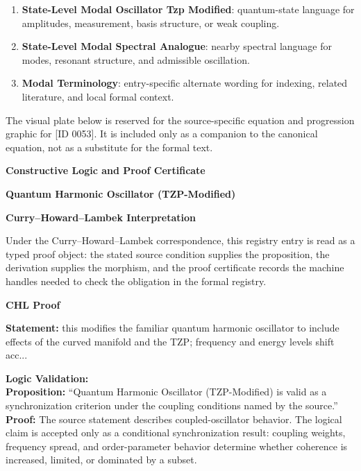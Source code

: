 \begingroup\footnotesize\sloppy
\begin{enumerate}[leftmargin=1.35em,itemsep=1pt,topsep=1pt,parsep=0pt]
\item \textbf{State-Level Modal Oscillator Tzp Modified}: quantum-state language for amplitudes, measurement, basis structure, or weak coupling.
\item \textbf{State-Level Modal Spectral Analogue}: nearby spectral language for modes, resonant structure, and admissible oscillation.
\item \textbf{Modal Terminology}: entry-specific alternate wording for indexing, related literature, and local formal context.
\end{enumerate}
\endgroup

\begingroup\footnotesize\sloppy
The visual plate below is reserved for the source-specific equation and progression graphic for [ID 0053]. It is included only as a companion to the canonical equation, not as a substitute for the formal text.
\par\endgroup
\ifTZPDarkEdition
{}
\fi

\clearpage
\begingroup\tzpsupportsetup
\noindent\textbf{\fontsize{10.8pt}{12.8pt}\selectfont [ID 0053] Constructive Logic and Proof Certificate}\par
\noindent\textbf{\fontsize{10pt}{12pt}\selectfont Quantum Harmonic Oscillator (TZP-Modified)}\par
\vspace{0.45em}
\begingroup
\footnotesize
\setlength{\parskip}{0.22em}
\setlength{\parindent}{0pt}
\noindent\textbf{Curry--Howard--Lambek Interpretation}\par
Under the Curry--Howard--Lambek correspondence, this registry entry is read as a typed proof
object: the stated source condition supplies the proposition, the derivation supplies the
morphism, and the proof certificate records the machine handles needed to check the obligation
in the formal registry.

\vspace{0.45em}
\noindent\textbf{CHL Proof}\par
\textbf{Statement:} this modifies the familiar quantum harmonic oscillator to include effects of the curved
manifold and the TZP; frequency and energy levels shift acc...

\textbf{Logic Validation:}\\
\textbf{Proposition:} ``Quantum Harmonic Oscillator (TZP-Modified) is valid as a synchronization criterion under
the coupling conditions named by the source.''\\
\textbf{Proof:} The source statement describes coupled-oscillator behavior. The logical claim is
accepted only as a conditional synchronization result: coupling weights, frequency
spread, and order-parameter behavior determine whether coherence is increased, limited,
or dominated by a subset.

